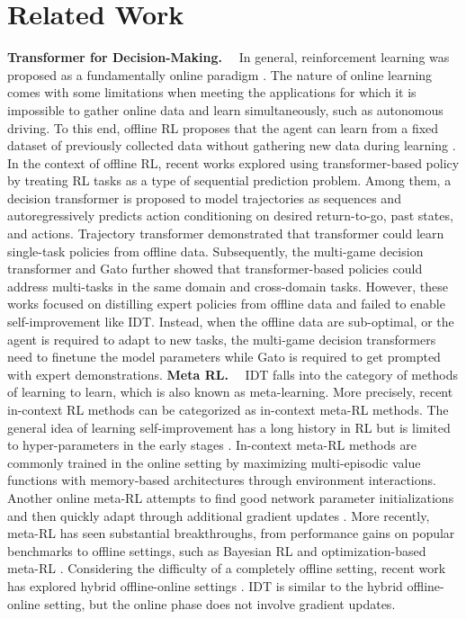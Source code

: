 \documentclass{article}
\theoremstyle{plain}
\theoremstyle{definition}
\theoremstyle{remark}
\begin{document}
\section{Related Work}
\noindent\textbf{Transformer for Decision-Making.}~~
In general, reinforcement learning was proposed as a fundamentally online paradigm \cite{38}. The nature of online learning comes with some limitations when meeting the applications for which it is impossible to gather online data and learn simultaneously, such as autonomous driving. To this end, offline RL proposes that the agent can learn from a fixed dataset of previously collected data without gathering new data during learning \cite{39,40,41,42}. In the context of offline RL, recent works explored using transformer-based policy by treating RL tasks as a type of sequential prediction problem. Among them, a decision transformer \cite{2} is proposed to model trajectories as sequences and autoregressively predicts action conditioning on desired return-to-go, past states, and actions. Trajectory transformer \cite{43} demonstrated that transformer could learn single-task policies from offline data. Subsequently, the multi-game decision transformer \cite{14} and Gato \cite{27} further showed that transformer-based policies could address multi-tasks in the same domain and cross-domain tasks. However, these works focused on distilling expert policies from offline data and failed to enable self-improvement like IDT. Instead, when the offline data are sub-optimal, or the agent is required to adapt to new tasks, the multi-game decision transformers need to finetune the model parameters while Gato is required to get prompted with expert demonstrations.
\noindent\textbf{Meta RL.}~~
IDT falls into the category of methods of learning to learn, which is also known as meta-learning. More precisely, recent in-context RL methods can be categorized as in-context meta-RL methods. The general idea of learning self-improvement has a long history in RL but is limited to hyper-parameters in the early stages \cite{31}. In-context meta-RL methods \cite{33,32} are commonly trained in the online setting by maximizing multi-episodic value functions with memory-based architectures through environment interactions. Another online meta-RL attempts to find good network parameter initializations and then quickly adapt through additional gradient updates \cite{46,45}. More recently, meta-RL has seen substantial breakthroughs, from performance gains on popular benchmarks to offline settings, such as Bayesian RL \cite{36} and optimization-based meta-RL \cite{37}. Considering the difficulty of a completely offline setting, recent work has explored hybrid offline-online settings \cite{34,35}. IDT is similar to the hybrid offline-online setting, but the online phase does not involve gradient updates.
\end{document}
